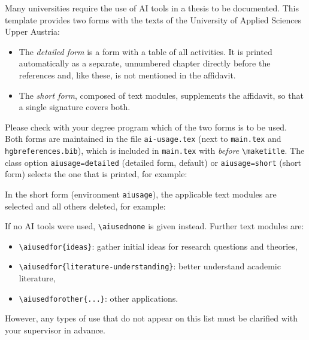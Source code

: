 Many universities require the use of AI tools in a thesis to be documented.
This template provides two forms with the texts of the University of Applied
Sciences Upper Austria:
%
\begin{itemize}
	\item The \emph{detailed form} is a form with a table of all activities. It
	is printed automatically as a separate, unnumbered chapter directly before
	the references and, like these, is not mentioned in the affidavit.
	\item The \emph{short form}, composed of text modules, supplements the
	affidavit, so that a single signature covers both.
\end{itemize}
%
Please check with your degree program which of the two forms is to be used.
Both forms are maintained in the file \verb!ai-usage.tex! (next to
\verb!main.tex! and \verb!hgbreferences.bib!), which is included in \verb!main.tex! with \verb!! \emph{before}
\verb!\maketitle!. The class option \texttt{aiusage=detailed} (detailed form,
default) or \texttt{aiusage=short} (short form) selects the one that is
printed, for example:
%
%
In the short form (environment \texttt{aiusage}), the applicable text modules
are selected and all others deleted, for example:
%
\begin{LaTeXCode}[numbers=none]
\begin{aiusage}
\end{aiusage}
\end{LaTeXCode}
%
If no AI tools were used, \verb!\aiusednone! is given instead. Further text
modules are:
%
\begin{itemize}
	\item \verb!!: gather initial ideas for research questions
	and theories,
	\item \verb!!: better understand
	academic literature,
	\item \verb!!: other applications.
\end{itemize}
%
However, any types of use that do not appear on this list must be clarified
with your supervisor in advance.


